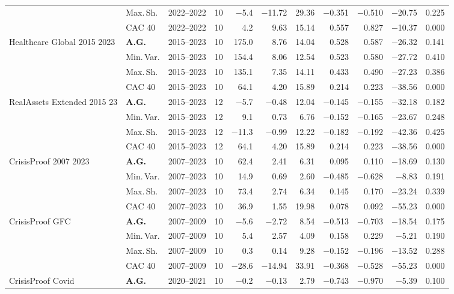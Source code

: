 \begin{longtable}{p{2.6cm} l c c r r r r r r r}
 & Max.\,Sh. & 2022--2022 & 10 & $-$5.4 & $-$11.72 & 29.36 & $-$0.351 & $-$0.510 & $-$20.75 & 0.225 \\
 & CAC 40 & 2022--2022 & 10 & 4.2 & 9.63 & 15.14 & 0.557 & 0.827 & $-$10.37 & 0.000 \\
\midrule
Healthcare Global 2015 2023 & \textbf{A.G.} & 2015--2023 & 10 & 175.0 & 8.76 & 14.04 & 0.528 & 0.587 & $-$26.32 & 0.141 \\
 & Min.\,Var. & 2015--2023 & 10 & 154.4 & 8.06 & 12.54 & 0.523 & 0.580 & $-$27.72 & 0.410 \\
 & Max.\,Sh. & 2015--2023 & 10 & 135.1 & 7.35 & 14.11 & 0.433 & 0.490 & $-$27.23 & 0.386 \\
 & CAC 40 & 2015--2023 & 10 & 64.1 & 4.20 & 15.89 & 0.214 & 0.223 & $-$38.56 & 0.000 \\
\midrule
RealAssets Extended 2015 23 & \textbf{A.G.} & 2015--2023 & 12 & $-$5.7 & $-$0.48 & 12.04 & $-$0.145 & $-$0.155 & $-$32.18 & 0.182 \\
 & Min.\,Var. & 2015--2023 & 12 & 9.1 & 0.73 & 6.76 & $-$0.152 & $-$0.165 & $-$23.67 & 0.248 \\
 & Max.\,Sh. & 2015--2023 & 12 & $-$11.3 & $-$0.99 & 12.22 & $-$0.182 & $-$0.192 & $-$42.36 & 0.425 \\
 & CAC 40 & 2015--2023 & 12 & 64.1 & 4.20 & 15.89 & 0.214 & 0.223 & $-$38.56 & 0.000 \\
\midrule
CrisisProof 2007 2023 & \textbf{A.G.} & 2007--2023 & 10 & 62.4 & 2.41 & 6.31 & 0.095 & 0.110 & $-$18.69 & 0.130 \\
 & Min.\,Var. & 2007--2023 & 10 & 14.9 & 0.69 & 2.60 & $-$0.485 & $-$0.628 & $-$8.83 & 0.191 \\
 & Max.\,Sh. & 2007--2023 & 10 & 73.4 & 2.74 & 6.34 & 0.145 & 0.170 & $-$23.24 & 0.339 \\
 & CAC 40 & 2007--2023 & 10 & 36.9 & 1.55 & 19.98 & 0.078 & 0.092 & $-$55.23 & 0.000 \\
\midrule
CrisisProof GFC & \textbf{A.G.} & 2007--2009 & 10 & $-$5.6 & $-$2.72 & 8.54 & $-$0.513 & $-$0.703 & $-$18.54 & 0.175 \\
 & Min.\,Var. & 2007--2009 & 10 & 5.4 & 2.57 & 4.09 & 0.158 & 0.229 & $-$5.21 & 0.190 \\
 & Max.\,Sh. & 2007--2009 & 10 & 0.3 & 0.14 & 9.28 & $-$0.152 & $-$0.196 & $-$13.52 & 0.288 \\
 & CAC 40 & 2007--2009 & 10 & $-$28.6 & $-$14.94 & 33.91 & $-$0.368 & $-$0.528 & $-$55.23 & 0.000 \\
\midrule
CrisisProof Covid & \textbf{A.G.} & 2020--2021 & 10 & $-$0.2 & $-$0.13 & 2.79 & $-$0.743 & $-$0.970 & $-$5.39 & 0.100 \\

\end{longtable}
